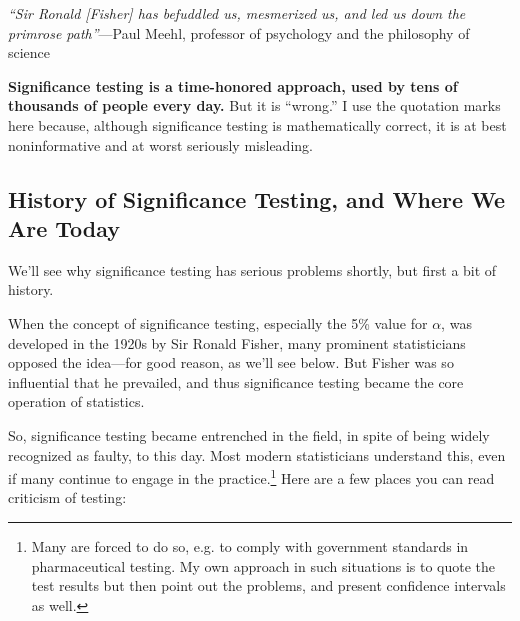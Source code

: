 {\it ``Sir Ronald [Fisher] has befuddled us, mesmerized us, and led us
down the primrose path''}---Paul Meehl, professor of psychology and the
philosophy of science

\bigskip

{\bf Significance testing is a time-honored approach, used by tens of thousands
of people every day.}  But it is ``wrong.'' I use the quotation marks
here because, although significance testing is mathematically correct, it
is at best noninformative and at worst seriously misleading.  

\subsection{History of Significance Testing, and Where We Are Today} 

We'll see why significance testing has serious problems shortly, but
first a bit of history.  

When the concept of significance testing, especially the 5\% value for
$\alpha$, was developed in the 1920s by Sir Ronald Fisher, many
prominent statisticians opposed the idea---for good reason, as we'll see
below.  But Fisher was so influential that he prevailed, and thus
significance testing became the core operation of statistics.

So, significance testing became entrenched in the field, in spite of
being widely recognized as faulty, to this day.  Most modern
statisticians understand this, even if many continue to engage in the
practice.\footnote{Many are forced to do so, e.g. to comply with
government standards in pharmaceutical testing.  My own approach in such
situations is to quote the test results but then point out the problems,
and present confidence intervals as well.}  Here are a few places you
can read criticism of testing:

